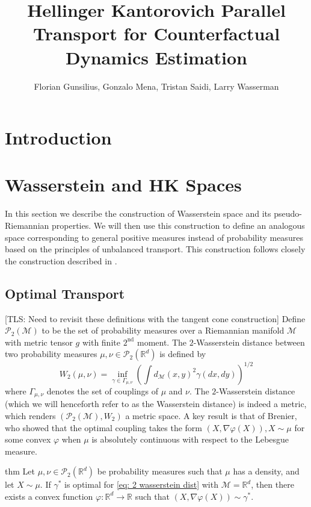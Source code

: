 \documentclass{article}
\title{Hellinger Kantorovich Parallel Transport for Counterfactual Dynamics Estimation}
\author{Florian Gunsilius, Gonzalo Mena, Tristan Saidi, Larry Wasserman}
\newcommand{\man}{\mathcal{M}}
\newcommand{\tls}[1]{{\color{cyan}[TLS: #1]}}
\begin{document}
\maketitle


\section{Introduction}

\section{Wasserstein and HK Spaces}

In this section we describe the construction of Wasserstein space and its pseudo-Riemannian properties.  We will then use this construction to define an analogous space corresponding to general positive measures instead of probability measures based on the principles of unbalanced transport. This construction follows closely the construction described in \cite{clancy2021interpolating, chewi2024statisticaloptimaltransport, liero2018optimal, liero2016optimal, chizat2018interpolating, kondratyev2016newoptimaltransportdistance}.  

\subsection{Optimal Transport} \tls{Need to revisit these definitions with the tangent cone construction}
Define $\mathcal{P}_{2}(\man)$ to be the set of probability measures over a Riemannian manifold $\man$ with metric tensor $g$ with finite $2^{\text{nd}}$ moment. The $2$-Wasserstein distance between two probability measures $\mu, \nu \in \mathcal{P}_{2}(\mathbb{R}^d)$ is defined by
\begin{equation}
    W_2(\mu, \nu) = \inf_{\gamma \in \Gamma_{\mu, \nu}}\left(\int d_{\man}(x,y)^2\gamma(dx, dy)\right)^{1/2} \label{eq: 2 wasserstein dist}
\end{equation}
where $\Gamma_{\mu, \nu}$ denotes the set of couplings of $\mu$ and $\nu$. The $2$-Wasserstein distance (which we will henceforth refer to as the Wasserstein distance) is indeed a metric, which renders $(\mathcal{P}_{2}(\man), W_2)$ a metric space. A key result is that of Brenier, who showed that the optimal coupling takes the form $(X, \nabla \varphi(X)), X \sim \mu$ for some convex $\varphi$ when $\mu$ is absolutely continuous with respect to the Lebesgue measure.

\begin{restatable}[Brenier]{thm}{}
    Let $\mu, \nu \in \mathcal{P}_2(\mathbb{R}^d)$ be probability measures such that $\mu$ has a density, and let $X \sim \mu$. If $\gamma^*$ is optimal for \cref{eq: 2 wasserstein dist} with $\man = \mathbb{R}^d$, then there exists a convex function $\varphi:\mathbb{R}^d \rightarrow \mathbb{R}$ such that $(X, \nabla\varphi(X))\sim \gamma^*$. 
\end{restatable}
\end{document}
